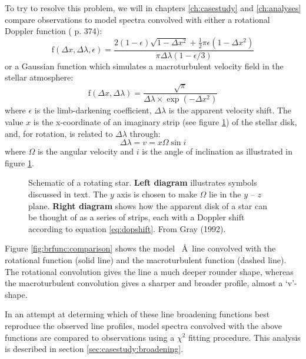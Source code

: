 To try to resolve this problem, we will in chapters \ref{ch:casestudy}
and \ref{ch:analyses} compare observations to model spectra convolved
with either a rotational Doppler function (\cite{gray} p. 374):
%
\begin{equation}
\mathrm{f}(\Delta x,\Delta\lambda,\epsilon) =
\frac{2(1-\epsilon)\sqrt{1-\Delta x^2} + \frac{1}{2} \pi \epsilon (1
-\Delta x^2)}{\pi \Delta \lambda (1 - \epsilon/3)} 
\label{eq:mod:rotation}
\end{equation}
%
or a Gaussian function which simulates a macroturbulent velocity field
in the stellar atmosphere:
%
\begin{equation}
\mathrm{f}(\Delta x,\Delta\lambda) =
\frac{\sqrt{\pi}}{\Delta\lambda \times \exp(-\Delta x^2)}
\end{equation}
%
where $\epsilon$ is the limb-darkening coefficient, $\Delta\lambda$ is
the apparent velocity shift. The value $x$ is the x-coordinate of an
imaginary strip (see figure \ref{fig:rot:gray}) of the stellar disk,
and, for rotation, is related to $\Delta\lambda$ through:
%
\begin{equation}
\Delta\lambda = v = x\Omega\sin i
\label{eq:dopshift}
\end{equation}
%
where $\Omega$ is the angular velocity and $i$ is the angle
of inclination as illustrated in figure \ref{fig:rot:gray}.

\begin{figure} %
\epsfxsize=12cm
\setlength{\cen}{(\textwidth / 2) - (\epsfxsize / 2)}
\hspace{\cen}
\caption[Schematic of a rotating star]
{\fcfont Schematic of a rotating star. \textbf{Left diagram} illustrates
symbols discussed in text. The $y$ axis is chosen to make $\Omega$ lie
in the $y$ -- $z$ plane. \textbf{Right diagram} shows how the
apparent disk of a star can be thought of as a series of strips, each
with a Doppler shift according to equation \ref{eq:dopshift}. From Gray (1992).}

\label{fig:rot:gray}
\end{figure}   %

Figure \ref{fig:brfunc:comparison} shows the model \hei~\AA\
line convolved with the rotational function (solid line) and the
macroturbulent function (dashed line). The rotational convolution gives
the line a much deeper rounder shape, whereas the macroturbulent
convolution gives a sharper and broader profile, almost a `v'-shape.

In an attempt at determing which of these line broadening functions
best reproduce the observed line profiles, model spectra convolved
with the above functions are compared to observations using a $\chi^2$
fitting procedure. This analysis is described in section
\ref{sec:casestudy:broadening}.

